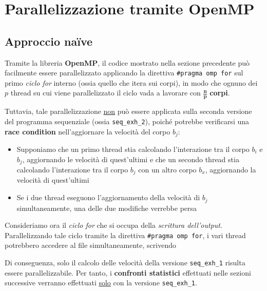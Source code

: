 \documentclass[12pt]{report}
\begin{document}
    \section{Parallelizzazione tramite OpenMP}

    \subsection{Approccio naïve}

    Tramite la libreria \textbf{OpenMP}, il codice mostrato nella sezione precedente può facilmente essere parallelizzato applicando la direttiva \texttt{\#pragma omp for} sul primo \textit{ciclo for} interno (ossia quello che itera sui corpi), in modo che ognuno dei $p$ thread su cui viene parallelizzato il ciclo vada a lavorare con $\mathbf{\frac{n}{p}}$ \textbf{corpi}.

    Tuttavia, tale parallelizzazione \underline{non} può essere applicata sulla seconda versione del programma sequenziale (ossia \texttt{seq\_exh\_2}), poiché potrebbe verificarsi una \textbf{race condition} nell'aggiornare la velocità del corpo $b_j$:
    
    \begin{itemize}
        \item Supponiamo che un primo thread stia calcolando l'interazione tra il corpo $b_i$ e $b_j$, aggiornando le velocità di quest'ultimi e che un secondo thread stia calcolando l'interazione tra il corpo $b_j$ con un altro corpo $b_x$, aggiornando la velocità di quest'ultimi
        \item Se i due thread eseguono l'aggiornamento della velocità di $b_j$ simultaneamente, una delle due modifiche verrebbe persa
    \end{itemize}

    Consideriamo ora il \textit{ciclo for} che si occupa della \textit{scrittura dell'output}. Parallelizzando tale ciclo tramite la direttiva \texttt{\#pragma omp for}, i vari thread potrebbero accedere al file simultaneamente, scrivendo  

    Di conseguenza, solo il calcolo delle velocità della versione \texttt{seq\_exh\_1} risulta essere parallelizzabile. Per tanto, i \textbf{confronti statistici} effettuati nelle sezioni successive verranno effettuati \underline{solo} con la versione \texttt{seq\_exh\_1}.
\end{document}
